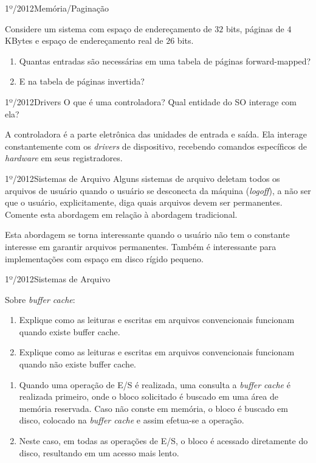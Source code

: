 \begin{exercicio}
  {1º/2012}{Memória/Paginação}
  {Considere um sistema com espaço de endereçamento de $32$ bits, páginas de $4$ KBytes e espaço de endereçamento real de $26$ bits.
  \begin{enumerate}[label=(\alph*)]
    \item Quantas entradas são necessárias em uma tabela de páginas forward-mapped?
    \item E na tabela de páginas invertida?
  \end{enumerate}}
\end{exercicio}

\begin{exercicio}
  {1º/2012}{Drivers}
  {O que é uma controladora? Qual entidade do SO interage com ela?}

  A controladora é a parte eletrônica das unidades de entrada e saída. Ela interage constantemente com os \textit{drivers} de dispositivo, recebendo comandos específicos de \textit{hardware} em seus registradores.
\end{exercicio}

\begin{exercicio}
  {1º/2012}{Sistemas de Arquivo}
  {Alguns sistemas de arquivo deletam todos os arquivos de usuário quando o usuário se desconecta da máquina (\textit{logoff}), a não ser que o usuário, explicitamente, diga quais arquivos devem ser permanentes. Comente esta abordagem em relação à abordagem tradicional.}

  Esta abordagem se torna interessante quando o usuário não tem o constante interesse em garantir arquivos permanentes. Também é interessante para implementações com espaço em disco rígido pequeno.
\end{exercicio}

\begin{exercicio}
  {1º/2012}{Sistemas de Arquivo}
  {Sobre \textit{buffer cache}:
  \begin{enumerate}[label=(\alph*)]
    \item Explique como as leituras e escritas em arquivos convencionais funcionam quando existe buffer cache.
    \item Explique como as leituras e escritas em arquivos convencionais funcionam quando não existe buffer cache.
  \end{enumerate}}

  \begin{enumerate}[label=(\alph*)]
    \item Quando uma operação de E/S é realizada, uma consulta a \textit{buffer cache} é realizada primeiro, onde o bloco solicitado é buscado em uma área de memória reservada. Caso não conste em memória, o bloco é buscado em disco, colocado na \textit{buffer cache} e assim efetua-se a operação.

    \item Neste caso, em todas as operações de E/S, o bloco é acessado diretamente do disco, resultando em um acesso mais lento.
  \end{enumerate}
\end{exercicio}

